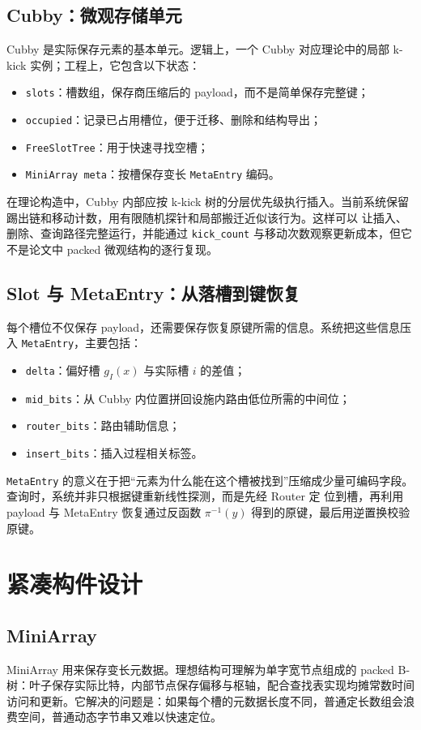 \subsection{Cubby：微观存储单元}
Cubby 是实际保存元素的基本单元。逻辑上，一个 Cubby 对应理论中的局部 k-kick 实例；工程上，它包含以下状态：
\begin{itemize}
  \item \texttt{slots}：槽数组，保存商压缩后的 payload，而不是简单保存完整键；
  \item \texttt{occupied}：记录已占用槽位，便于迁移、删除和结构导出；
  \item \texttt{FreeSlotTree}：用于快速寻找空槽；
  \item \texttt{MiniArray meta}：按槽保存变长 \texttt{MetaEntry} 编码。
\end{itemize}

在理论构造中，Cubby 内部应按 k-kick 树的分层优先级执行插入。当前系统保留踢出链和移动计数，用有限随机探针和局部搬迁近似该行为。这样可以
让插入、删除、查询路径完整运行，并能通过 \texttt{kick\_count} 与移动次数观察更新成本，但它不是论文中 packed 微观结构的逐行复现。

\subsection{Slot 与 MetaEntry：从落槽到键恢复}
每个槽位不仅保存 payload，还需要保存恢复原键所需的信息。系统把这些信息压入 \texttt{MetaEntry}，主要包括：
\begin{itemize}
  \item \texttt{delta}：偏好槽 \(g_I(x)\) 与实际槽 \(i\) 的差值；
  \item \texttt{mid\_bits}：从 Cubby 内位置拼回设施内路由低位所需的中间位；
  \item \texttt{router\_bits}：路由辅助信息；
  \item \texttt{insert\_bits}：插入过程相关标签。
\end{itemize}

\texttt{MetaEntry} 的意义在于把“元素为什么能在这个槽被找到”压缩成少量可编码字段。查询时，系统并非只根据键重新线性探测，而是先经 Router 定
位到槽，再利用 payload 与 MetaEntry 恢复通过反函数 \(\pi^{-1}(y)\) 得到的原键，最后用逆置换校验原键。

\section{紧凑构件设计}
\subsection{MiniArray}
MiniArray 用来保存变长元数据。理想结构可理解为单字宽节点组成的 packed B-树：叶子保存实际比特，内部节点保存偏移与枢轴，配合查找表实现均摊常数时间访问和更新。它解决的问题是：如果每个槽的元数据长度不同，普通定长数组会浪费空间，普通动态字节串又难以快速定位。


